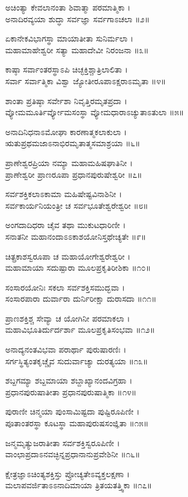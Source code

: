 ಅಚಿಂತ್ಯಾ ಕೇವಲಾನಂತಾ ಶಿವಾತ್ಮಾ ಪರಮಾತ್ಮಿಕಾ ।\\
ಅನಾದಿರವ್ಯಯಾ ಶುದ್ಧಾ ಸರ್ವಜ್ಞಾ ಸರ್ವಗಾಽಚಲಾ ॥೨॥

ಏಕಾನೇಕವಿಭಾಗಸ್ಥಾ ಮಾಯಾತೀತಾ ಸುನಿರ್ಮಲಾ ।\\
ಮಹಾಮಾಹೇಶ್ವರೀ ಸತ್ಯಾ ಮಹಾದೇವೀ ನಿರಂಜನಾ ॥೩॥

ಕಾಷ್ಠಾ ಸರ್ವಾಂತರಸ್ಥಾಽಪಿ ಚಿಚ್ಛಕ್ತಿಶ್ಚಾತ್ರಿಲಾಲಿತಾ ।\\
ಸರ್ವಾ ಸರ್ವಾತ್ಮಿಕಾ ವಿಶ್ವಾ ಜ್ಯೋತೀರೂಪಾಽಕ್ಷರಾಽಮೃತಾ ॥೪॥

ಶಾಂತಾ ಪ್ರತಿಷ್ಠಾ ಸರ್ವೇಶಾ ನಿವೃತ್ತಿರಮೃತಪ್ರದಾ ।\\
ವ್ಯೋಮಮೂರ್ತಿರ್ವ್ಯೋಮಸಂಸ್ಥಾ ವ್ಯೋಮಧಾರಾಽಚ್ಯುತಾಽತುಲಾ ॥೫॥

ಅನಾದಿನಿಧನಾಽಮೋಘಾ ಕಾರಣಾತ್ಮಕಲಾಕುಲಾ ।\\
ಋತುಪ್ರಥಮಜಾಽನಾಭಿರಮೃತಾತ್ಮಸಮಾಶ್ರಯಾ ॥೬॥

ಪ್ರಾಣೇಶ್ವರಪ್ರಿಯಾ ನಮ್ಯಾ ಮಹಾಮಹಿಷಘಾತಿನೀ ।\\
ಪ್ರಾಣೇಶ್ವರೀ ಪ್ರಾಣರೂಪಾ ಪ್ರಧಾನಪುರುಷೇಶ್ವರೀ ॥೭॥

ಸರ್ವಶಕ್ತಿಕಲಾಽಕಾಮಾ ಮಹಿಷೇಷ್ಟವಿನಾಶಿನೀ ।\\
ಸರ್ವಕಾರ್ಯನಿಯಂತ್ರೀ ಚ ಸರ್ವಭೂತೇಶ್ವರೇಶ್ವರೀ ॥೮॥

ಅಂಗದಾದಿಧರಾ ಚೈವ ತಥಾ ಮುಕುಟಧಾರಿಣೀ ।\\
ಸನಾತನೀ ಮಹಾನಂದಾಽಽಕಾಶಯೋನಿಸ್ತಥೇಚ್ಯತೇ ॥೯॥

ಚಿತ್ಪ್ರಕಾಶಸ್ವರೂಪಾ ಚ ಮಹಾಯೋಗೇಶ್ವರೇಶ್ವರೀ ।\\
ಮಹಾಮಾಯಾ ಸದುಷ್ಪಾರಾ ಮೂಲಪ್ರಕೃತಿರೀಶಿಕಾ ॥೧೦॥

ಸಂಸಾರಯೋನಿಃ ಸಕಲಾ ಸರ್ವಶಕ್ತಿಸಮುದ್ಭವಾ ।\\
ಸಂಸಾರಪಾರಾ ದುರ್ವಾರಾ ದುರ್ನಿರೀಕ್ಷಾ ದುರಾಸದಾ ॥೧೧॥

ಪ್ರಾಣಶಕ್ತಿಶ್ಚ ಸೇವ್ಯಾ ಚ ಯೋಗಿನೀ ಪರಮಾಕಲಾ ।\\
ಮಹಾವಿಭೂತಿರ್ದುರ್ದರ್ಶಾ ಮೂಲಪ್ರಕೃತಿಸಂಭವಾ ॥೧೨॥

ಅನಾದ್ಯನಂತವಿಭವಾ ಪರಾರ್ಥಾ ಪುರುಷಾರಣಿಃ ।\\
ಸರ್ಗಸ್ಥಿತ್ಯಂತಕೃಚ್ಚೈವ ಸುದುರ್ವಾಚ್ಯಾ ದುರತ್ಯಯಾ ॥೧೩॥

ಶಬ್ದಗಮ್ಯಾ ಶಬ್ದಮಾಯಾ ಶಬ್ದಾಖ್ಯಾನಂದವಿಗ್ರಹಾ ।\\
ಪ್ರಧಾನಪುರುಷಾತೀತಾ ಪ್ರಧಾನಪುರುಷಾತ್ಮಿಕಾ ॥೧೪॥

ಪುರಾಣೀ ಚಿನ್ಮಯಾ ಪುಂಸಾಮಿಷ್ಟದಾ ಪುಷ್ಟಿರೂಪಿಣೀ ।\\
ಪೂತಾಂತರಸ್ಥಾ ಕೂಟಸ್ಥಾ ಮಹಾಪುರುಷಸಂಜ್ಞಿತಾ ॥೧೫॥

ಜನ್ಮಮೃತ್ಯುಜರಾತೀತಾ ಸರ್ವಶಕ್ತಿಸ್ವರೂಪಿಣೀ ।\\
ವಾಂಛಾಪ್ರದಾಽನವಚ್ಛಿನ್ನಪ್ರಧಾನಾನುಪ್ರವೇಶಿನೀ ॥೧೬॥

ಕ್ಷೇತ್ರಜ್ಞಾಽಚಿಂತ್ಯಶಕ್ತಿಸ್ತು ಪ್ರೋಚ್ಯತೇಽವ್ಯಕ್ತಲಕ್ಷಣಾ ।\\
ಮಲಾಪವರ್ಜಿತಾಽಽನಾದಿಮಾಯಾ ತ್ರಿತಯತತ್ತ್ವಿಕಾ ॥೧೭॥

